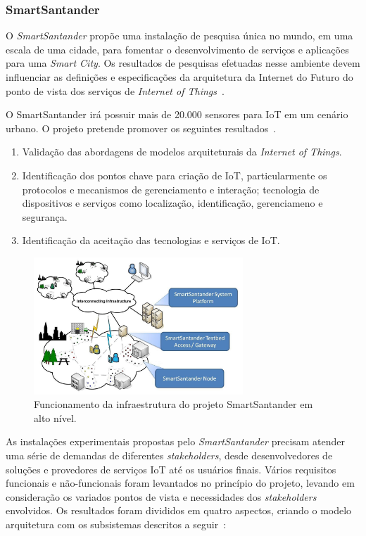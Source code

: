 \subsubsection{SmartSantander}
O \textit{SmartSantander} propõe uma instalação de pesquisa única no mundo, em uma escala de uma cidade,
para fomentar o desenvolvimento de serviços e aplicações para uma \textit{Smart City}.
Os resultados de pesquisas efetuadas nesse ambiente devem influenciar as definições e especificações da arquitetura da
Internet do Futuro do ponto de vista dos serviços de \textit{Internet of Things}~\cite{citeulike:13508566}.

O SmartSantander irá possuir mais de 20.000 sensores para IoT em um cenário urbano. O projeto pretende promover os
seguintes resultados~\cite{smartsantandersite}.
\begin{enumerate}
\item Validação das abordagens de modelos arquiteturais da \textit{Internet of Things}.
\item Identificação dos pontos chave para criação de IoT, particularmente os protocolos e mecanismos de gerenciamento e
interação; tecnologia de dispositivos e serviços como localização, identificação, gerenciameno e segurança.
\item Identificação da aceitação das tecnologias e serviços de IoT.
\end{enumerate}

\begin{figure}[H]
	\centering
		\includegraphics[width=0.7\textwidth]{fig/smartsantander.jpg}
	\caption{Funcionamento da infraestrutura do projeto SmartSantander em alto nível.}
\end{figure}

As instalações experimentais propostas pelo \textit{SmartSantander} precisam atender uma série de demandas
de diferentes \textit{stakeholders}, desde desenvolvedores de soluções e provedores de serviços IoT até os usuários finais.
Vários requisitos funcionais e não-funcionais foram levantados no princípio do projeto, levando em consideração
os variados pontos de vista e necessidades dos \textit{stakeholders} envolvidos. Os resultados foram divididos em quatro
aspectos, criando o modelo arquitetura com os subsistemas descritos a seguir~\cite{citeulike:13508566}:


